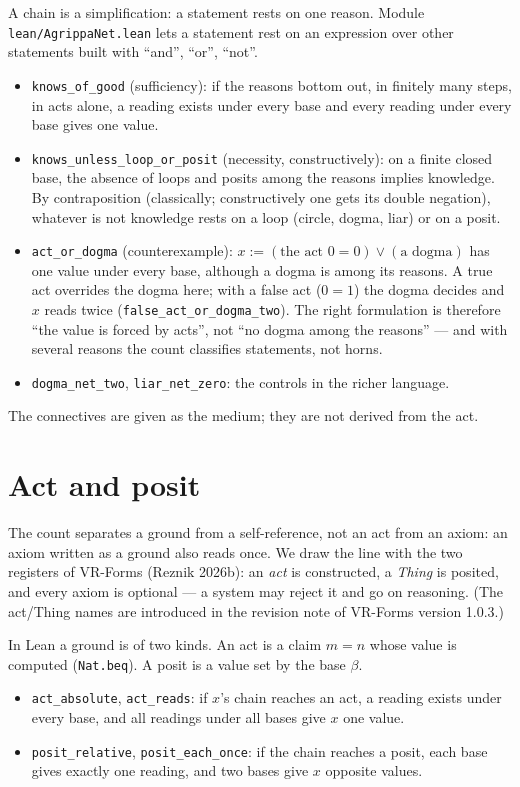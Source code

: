 \documentclass[11pt,a4paper]{article}
\newcommand{\code}[1]{\texttt{#1}}
\begin{document}
A chain is a simplification: a statement rests on one reason. Module \code{lean/AgrippaNet.lean} lets a statement
rest on an expression over other statements built with ``and'', ``or'', ``not''.
\begin{itemize}
\item \code{knows\_of\_good} (sufficiency): if the reasons bottom out, in finitely many steps, in acts alone, a reading
  exists under every base and every reading under every base gives one value.
\item \code{knows\_unless\_loop\_or\_posit} (necessity, constructively): on a finite closed base, the absence of loops
  and posits among the reasons implies knowledge. By contraposition (classically; constructively one gets
  its double negation), whatever is not knowledge rests on a loop (circle, dogma, liar) or on a posit.
\item \code{act\_or\_dogma} (counterexample): $x := (\text{the act } 0 = 0) \lor (\text{a dogma})$ has one value under
  every base, although a dogma is among its reasons. A true act overrides the dogma here; with a false act ($0 = 1$)
  the dogma decides and $x$ reads twice (\code{false\_act\_or\_dogma\_two}). The right formulation is therefore ``the value is forced by acts'',
  not ``no dogma among the reasons'' --- and with several reasons the count classifies statements, not horns.
\item \code{dogma\_net\_two}, \code{liar\_net\_zero}: the controls in the richer language.
\end{itemize}
The connectives are given as the medium; they are not derived from the act.

\section{Act and posit}

The count separates a ground from a self-reference, not an act from an axiom: an axiom written as a ground also reads
once. We draw the line with the two registers of VR-Forms (Reznik 2026b): an \emph{act} is constructed, a \emph{Thing}
is posited, and every axiom is optional --- a system may reject it and go on reasoning. (The act/Thing names are
introduced in the revision note of VR-Forms version 1.0.3.)

In Lean a ground is of two kinds. An act is a claim $m = n$ whose value is computed (\code{Nat.beq}). A posit is a value
set by the base $\beta$.
\begin{itemize}
\item \code{act\_absolute}, \code{act\_reads}: if $x$'s chain reaches an act, a reading exists under every base,
  and all readings under all bases give $x$ one value.
\item \code{posit\_relative}, \code{posit\_each\_once}: if the chain reaches a posit, each base gives exactly one
  reading, and two bases give $x$ opposite values.
\end{itemize}
\end{document}

